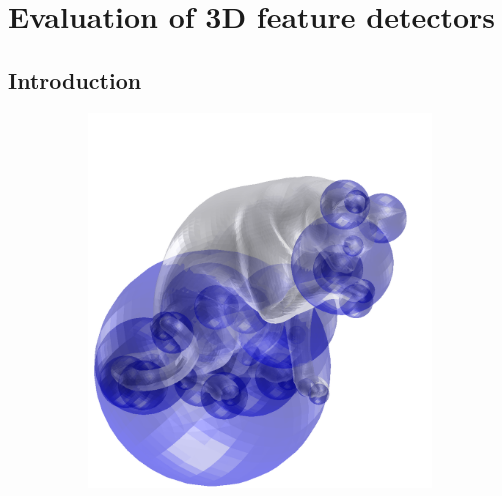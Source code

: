 \chapter{Evaluation of 3D feature detectors}
\label{chap/eval}

\section{Introduction}

\begin{figure}[t]
	\centering 
	\begin{subfigure}[t]{0.30\linewidth} 
		\centering 
		\includegraphics[width=1\linewidth]{./fig/eval/cat_dog.png} 
		\label{fig/eval/testshapes/dog}
	\end{subfigure}
	\begin{subfigure}[t]{0.30\linewidth} 
		\centering 

\end{subfigure}
\end{figure}
